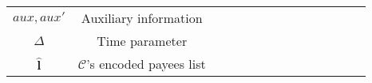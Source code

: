 \begin{table}[!htbp]
\begin{scriptsize}
\begin{center}
{{\begin{tabular}{|c|c|c|c|c|c|c|c|c|c|c|c|c|c|}
\cellcolor{gray!20}\scriptsize$aux, aux'$ &\cellcolor{gray!20}\scriptsize  Auxiliary information\\ 
%
%
\cellcolor{white!20}\scriptsize$\Delta$ &\cellcolor{white!20}\scriptsize  Time parameter \\ 

%


%

%
\cellcolor{gray!20}\scriptsize$\hat{\bm{l}}$ &\cellcolor{gray!20}\scriptsize  $\mathcal{C}$'s encoded payees list\\ 
%



\end{tabular}}}
\end{center}
\end{scriptsize}
\end{table}
